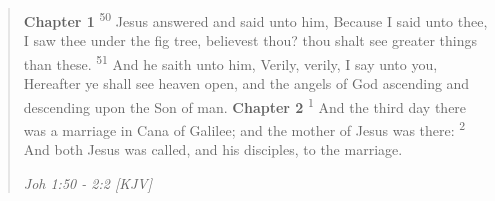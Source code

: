 \begin{quote}
\textbf{Chapter 1}
\textsuperscript{50} Jesus answered and said unto him, Because I said unto thee, I saw thee under the fig tree, believest thou? thou shalt see greater things than these.
\textsuperscript{51} And he saith unto him, Verily, verily, I say unto you, Hereafter ye shall see heaven open, and the angels of God ascending and descending upon the Son of man.
\textbf{Chapter 2}
\textsuperscript{1} And the third day there was a marriage in Cana of Galilee; and the mother of Jesus was there:
\textsuperscript{2} And both Jesus was called, and his disciples, to the marriage.
\begin{flushright}
\emph{Joh 1:50 - 2:2 [KJV]}
\end{flushright}
\end{quote}